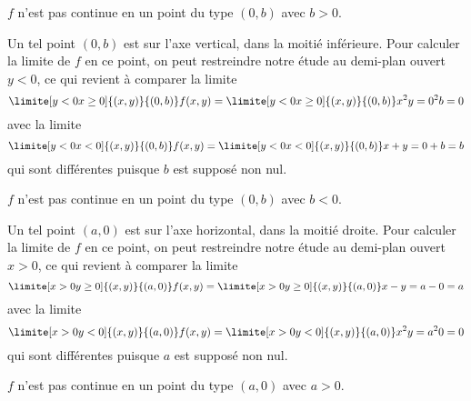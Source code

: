 \begin{example}
\begin{subproof}
		\conclusion \( f\) n'est pas continue en un point du type \( (0,b)\) avec \( b
		> 0\).

		\spitem[Si \( a = 0\) et \( b < 0\)]
		Un tel point \( (0,b)\) est sur
		l'axe vertical, dans la moitié inférieure. Pour calculer la limite de
		\( f\) en ce point, on peut restreindre notre étude au demi-plan ouvert
		\( y < 0\), ce qui revient à comparer la limite
		\begin{equation*}
			\limite[y<0\\x\geq 0] {(x,y)} {(0,b)} f(x,y) =   \limite[y<0\\x\geq
				0] {(x,y)} {(0,b)} x^2 y = 0^2 b = 0
		\end{equation*}
		avec la limite
		\begin{equation*}
			\limite[y<0\\x<0] {(x,y)} {(0,b)} f(x,y) =   \limite[y<0\\x<0]
			{(x,y)} {(0,b)} x+y = 0 + b = b
		\end{equation*}
		qui sont différentes puisque \( b\) est supposé non nul.

		\conclusion \( f\) n'est pas continue en un point du type \( (0,b)\) avec \( b
		< 0\).

		\spitem[Si \( a > 0\) et \( b = 0\)]
		Un tel point \( (a,0)\) est sur
		l'axe horizontal, dans la moitié droite. Pour calculer la limite de
		\( f\) en ce point, on peut restreindre notre étude au demi-plan ouvert
		\( x > 0\), ce qui revient à comparer la limite
		\begin{equation*}
			\limite[x>0\\y \geq 0] {(x,y)} {(a,0)} f(x,y) =   \limite[x>0\\y \geq
				0] {(x,y)} {(a,0)} x-y = a - 0 = a
		\end{equation*}
		avec la limite
		\begin{equation*}
			\limite[x>0\\y < 0] {(x,y)} {(a,0)} f(x,y) =   \limite[x>0\\y < 0]
			{(x,y)} {(a,0)} x^2y = a^2 0 = 0
		\end{equation*}
		qui sont différentes puisque \( a\) est supposé non nul.

		\conclusion \( f\) n'est pas continue en un point du type \( (a,0)\) avec \( a
		> 0\).


\end{subproof}
\end{example}
